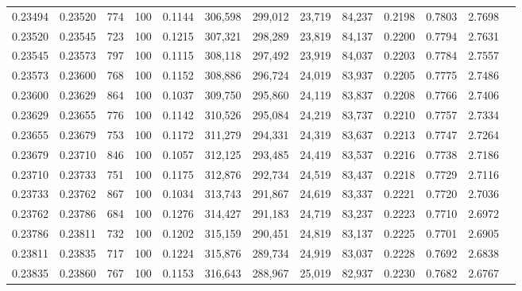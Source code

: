 \begin{tabular}{rrrrrrrrrrrrr}
0.23494 & 0.23520 &   774 & 100 &                                     0.1144 & 306,598 & 299,012 &  23,719 &  84,237 & 0.2198 & 0.7803 & 2.7698 \\
0.23520 & 0.23545 &   723 & 100 &                                     0.1215 & 307,321 & 298,289 &  23,819 &  84,137 & 0.2200 & 0.7794 & 2.7631 \\
0.23545 & 0.23573 &   797 & 100 &                                     0.1115 & 308,118 & 297,492 &  23,919 &  84,037 & 0.2203 & 0.7784 & 2.7557 \\
0.23573 & 0.23600 &   768 & 100 &                                     0.1152 & 308,886 & 296,724 &  24,019 &  83,937 & 0.2205 & 0.7775 & 2.7486 \\
0.23600 & 0.23629 &   864 & 100 &                                     0.1037 & 309,750 & 295,860 &  24,119 &  83,837 & 0.2208 & 0.7766 & 2.7406 \\
0.23629 & 0.23655 &   776 & 100 &                                     0.1142 & 310,526 & 295,084 &  24,219 &  83,737 & 0.2210 & 0.7757 & 2.7334 \\
0.23655 & 0.23679 &   753 & 100 &                                     0.1172 & 311,279 & 294,331 &  24,319 &  83,637 & 0.2213 & 0.7747 & 2.7264 \\
0.23679 & 0.23710 &   846 & 100 &                                     0.1057 & 312,125 & 293,485 &  24,419 &  83,537 & 0.2216 & 0.7738 & 2.7186 \\
0.23710 & 0.23733 &   751 & 100 &                                     0.1175 & 312,876 & 292,734 &  24,519 &  83,437 & 0.2218 & 0.7729 & 2.7116 \\
0.23733 & 0.23762 &   867 & 100 &                                     0.1034 & 313,743 & 291,867 &  24,619 &  83,337 & 0.2221 & 0.7720 & 2.7036 \\
0.23762 & 0.23786 &   684 & 100 &                                     0.1276 & 314,427 & 291,183 &  24,719 &  83,237 & 0.2223 & 0.7710 & 2.6972 \\
0.23786 & 0.23811 &   732 & 100 &                                     0.1202 & 315,159 & 290,451 &  24,819 &  83,137 & 0.2225 & 0.7701 & 2.6905 \\
0.23811 & 0.23835 &   717 & 100 &                                     0.1224 & 315,876 & 289,734 &  24,919 &  83,037 & 0.2228 & 0.7692 & 2.6838 \\
0.23835 & 0.23860 &   767 & 100 &                                     0.1153 & 316,643 & 288,967 &  25,019 &  82,937 & 0.2230 & 0.7682 & 2.6767 \\

\end{tabular}
